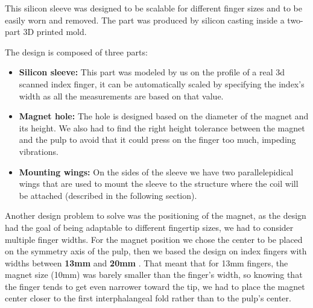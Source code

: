 This silicon sleeve was designed to be scalable for different finger sizes and to be easily worn and removed.
The part was produced by silicon casting inside a two-part 3D printed mold.

The design is composed of three parts:
\begin{itemize}
    \item \textbf{Silicon sleeve: } This part was modeled by us on the profile of a real 3d scanned index finger, it can be automatically scaled by specifying the index's width as all the measurements are based on that value.
    \item \textbf{Magnet hole: } The hole is designed based on the diameter of the magnet and its height. We also had to find the right height tolerance between the magnet and the pulp to avoid that it could press on the finger too much, impeding vibrations.
    \item \textbf{Mounting wings: } On the sides of the sleeve we have two parallelepidical wings that are used to mount the sleeve to the structure where the coil will be attached (described in the following section). 
\end{itemize}

Another design problem to solve was the positioning of the magnet, as the design had the goal of being adaptable to different fingertip sizes, we had to consider multiple finger widths. 
For the magnet position we chose the center to be placed on the symmetry axis of the pulp, then we based the design on index fingers with widths between \textbf{13mm} and \textbf{20mm} \cite{index_fingers_width}.
That meant that for 13mm fingers, the magnet size (10mm) was barely smaller than the finger's width, so knowing that the finger tends to get even narrower toward the tip, we had to place the magnet center closer to the first interphalangeal fold rather than to the pulp's center.


